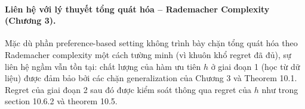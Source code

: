 \paragraph{Liên hệ với lý thuyết tổng quát hóa -- Rademacher Complexity (Chương 3).}
Mặc dù phần preference-based setting không trình bày chặn tổng quát hóa theo Rademacher complexity một cách tường minh (vì khuôn khổ regret đã đủ), sự liên hệ ngầm vẫn tồn tại: chất lượng của hàm ưu tiên $h$ ở giai đoạn 1 (học từ dữ liệu) được đảm bảo bởi các chặn generalization của Chương 3 và Theorem 10.1. Regret của giai đoạn 2 sau đó được kiểm soát thông qua regret của $h$ như trong section 10.6.2 và theorem 10.5.


    
    
    
    

\vspace{0.5cm}